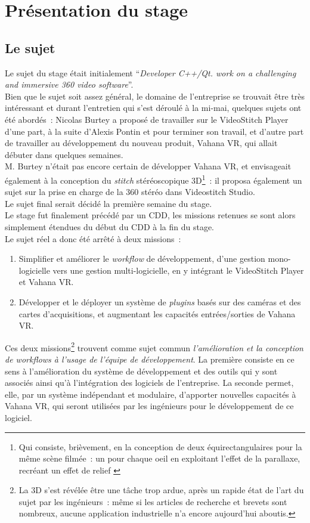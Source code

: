 \chapter{Présentation du stage}

\section{Le sujet}
\label{le-sujet}
Le sujet du stage était initialement \enquote{\textit{Developer C++/Qt.
work on a challenging and immersive 360 video software}}.\\
Bien que le sujet soit assez général, le domaine de l'entreprise se trouvait être très intéressant
et durant l'entretien qui s'est déroulé à la mi-mai, quelques sujets ont été
abordés~: Nicolas Burtey a proposé de travailler sur le VideoStitch Player d'une part,
à la suite d'Alexis Pontin et pour terminer son travail, et d'autre part de
travailler au développement du nouveau produit,
Vahana VR, qui allait débuter dans quelques semaines.\\
M. Burtey n'était pas encore certain de développer Vahana VR, 
et envisageait également à la conception du \textit{stitch} stéréoscopique 3D\footnote{Qui
consiste, brièvement, en la conception de deux équirectangulaires pour la même
scène filmée~: un pour chaque oeil en exploitant l'effet de la parallaxe, recréant 
un effet de relief\cite{videostitch-stereo}
\cite{image-stereoscopique}}~: il proposa également un sujet sur 
la prise en charge de la 360 stéréo dans Videostitch Studio.\\
Le sujet final serait décidé la première semaine du stage.\\
\newline
Le stage fut finalement précédé par un CDD, les missions retenues
se sont alors simplement étendues du début du CDD à la fin du stage.\\
Le sujet réel a donc été arrêté à deux missions~:
\begin{enumerate}
  \item Simplifier et améliorer le \textit{workflow} de développement, d'une
  gestion mono-logicielle vers une gestion multi-logicielle, en y intégrant 
  le VideoStitch Player et Vahana VR.
  \item Développer et le déployer un système de \textit{plugins} basés
  sur des caméras et des cartes d'acquisitions, et augmentant les
  capacités entrées/sorties de Vahana VR.
\end{enumerate}
Ces deux missions\footnote{La 3D s'est révélée être 
une tâche trop ardue, après un rapide état de l'art du sujet par les ingénieurs~: 
même si les articles de recherche et brevets sont nombreux, aucune application 
industrielle n'a encore aujourd'hui aboutis.} trouvent comme sujet commun \emph{l'amélioration et la conception 
de \textit{workflows} à l'usage de l'équipe de développement}. La première consiste en 
ce sens à l'amélioration du système de développement et des outils qui y sont associés ainsi qu'à l'intégration des logiciels
de l'entreprise. La seconde permet, elle, par un système indépendant et modulaire, d'apporter
nouvelles capacités à Vahana VR, qui seront utilisées par les ingénieurs pour le développement de ce logiciel.

